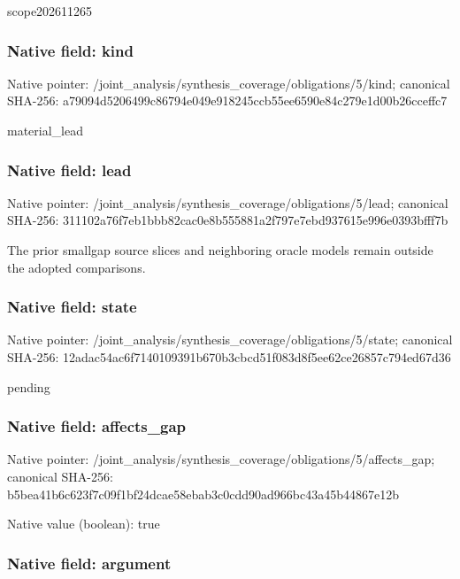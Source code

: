 \documentclass[10pt,a4paper]{article}
\begin{document}
scope202611265


\subsubsection{Native field: kind}


Native pointer: /joint\_analysis/synthesi\allowbreak{}s\_coverage/obligations/5\allowbreak{}/kind; canonical SHA-256: a79094d5206499c86794e049\allowbreak{}e918245ccb55ee6590e84c27\allowbreak{}9e1d00b26cceffc7


material\_lead


\subsubsection{Native field: lead}


Native pointer: /joint\_analysis/synthesi\allowbreak{}s\_coverage/obligations/5\allowbreak{}/lead; canonical SHA-256: 311102a76f7eb1bbb82cac0e\allowbreak{}8b555881a2f797e7ebd93761\allowbreak{}5e996e0393bfff7b


The prior smallgap source slices and neighboring oracle models remain outside the adopted comparisons.


\subsubsection{Native field: state}


Native pointer: /joint\_analysis/synthesi\allowbreak{}s\_coverage/obligations/5\allowbreak{}/state; canonical SHA-256: 12adac54ac6f7140109391b6\allowbreak{}70b3cbcd51f083d8f5ee62ce\allowbreak{}26857c794ed67d36


pending


\subsubsection{Native field: affects\_gap}


Native pointer: /joint\_analysis/synthesi\allowbreak{}s\_coverage/obligations/5\allowbreak{}/affects\_gap; canonical SHA-256: b5bea41b6c623f7c09f1bf24\allowbreak{}dcae58ebab3c0cdd90ad966b\allowbreak{}c43a45b44867e12b



Native value (boolean): true



\subsubsection{Native field: argument}
\end{document}
